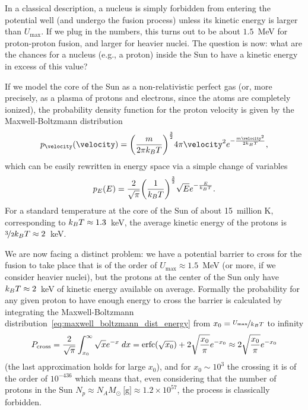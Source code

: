 In a classical description, a nucleus is simply forbidden from entering the potential
well (and undergo the fusion process) unless its kinetic energy is larger than $U_\text{max}$.
If we plug in the numbers, this turns out to be about $1.5$~MeV for proton-proton
fusion, and larger for heavier nuclei. The question is now: what are the chances
for a nucleus (e.g., a proton) inside the Sun to have a kinetic energy in excess of
this value?

If we model the core of the Sun as a non-relativistic perfect gas (or, more
precisely, as a plasma of protons and electrons, since the atoms are completely
ionized), the probability density function for the proton velocity is given by the
Maxwell-Boltzmann distribution
\begin{align}
  p_\velocity(\velocity) =
  \qty(\frac{m}{2\pi \kB T})^\frac{3}{2} 4\pi \velocity^2 e^{-\frac{m\velocity^2}{2\kB T}},
\end{align}
which can be easily rewritten in energy space via a simple change of variables
\begin{align}\label{eq:maxwell_boltzmann_dist_energy}
  p_E(E) = \frac{2}{\sqrt{\pi}} \qty(\frac{1}{k_B T})^\frac{3}{2} \sqrt{E} e^{-\frac{E}{k_B T}}.
\end{align}
For a standard temperature at the core of the Sun of about 15~million K, corresponding to
$k_B T \approx 1.3$~keV, the average kinetic energy of the protons is
$\nicefrac{3}{2} k_B T \approx 2$~keV.

We are now facing a distinct problem: we have a potential barrier to cross for the fusion
to take place that is of the order of $U_\text{max} \approx 1.5$~MeV (or more, if we
consider heavier nuclei), but the protons at the center of the Sun only have
$k_B T \approx 2$~keV of kinetic energy available on average.
Formally the probability for any given proton to have enough energy to cross the barrier
is calculated by integrating the Maxwell-Boltzmann
distribution~\eqref{eq:maxwell_boltzmann_dist_energy} from
$x_0 = \nicefrac{U_\text{max}}{k_B T}$ to infinity
\begin{align*}
  P_\text{cross} = \frac{2}{\sqrt{\pi}} \int_{x_0}^\infty \sqrt{x} e^{-x} \;d{x} =
  \text{erfc}\qty(\sqrt{x_0}) + 2 \sqrt{\frac{x_0}{\pi}} e^{-x_0} \approx
  2 \sqrt{\frac{x_0}{\pi}} e^{-x_0}
\end{align*}
(the last approximation holds for large $x_0$), and for $x_0 \sim 10^3$ the crossing
it is of the order of $10^{-436}$ which means that, even considering that the number of
protons in the Sun $N_p \approx N_A M_\odot~\text{[g]} \approx 1.2 \times 10^{57}$,
the process is classically forbidden.

